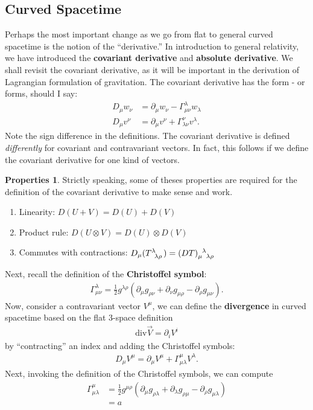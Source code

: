 \documentclass{book}
\numberwithin{equation}{section}
\theoremstyle{definition}
\newtheorem{propty}{Properties}[section]
\newcommand{\p}{\partial}
\begin{document}
\subsection{Curved Spacetime}
Perhaps the most important change as we go from flat to general curved spacetime is the notion of the ``derivative.'' In introduction to general relativity, we have introduced the \textbf{covariant derivative} and \textbf{absolute derivative}. We shall revisit the covariant derivative, as it will be important in the derivation of Lagrangian formulation of gravitation. The covariant derivative has the form - or forms, should I say:
\begin{align}
D_\mu w_\nu &= \p_\mu w_\nu - \Gamma^\lambda_{\mu\nu}w_\lambda\\
D_\mu v^\nu &= \p_\mu v^\nu + \Gamma^\nu_{\lambda\nu}v^\lambda.
\end{align}
Note the sign difference in the definitions. The covariant derivative is defined \textit{differently} for covariant and contravariant vectors. In fact, this follows if we define the covariant derivative for one kind of vectors.
\begin{propty}
	Strictly speaking, some of theses properties are required for the definition of the covariant derivative to make sense and work. 
	\begin{enumerate}
		\item Linearity: $D(U+V) = D(U) + D(V)$
		\item Product rule: $D(U\otimes V) = D(U)\otimes D(V)$
		\item Commutes with contractions: $D_\mu(\tensor{T}{^{\lambda}_{\lambda\rho}}) = \tensor{(DT)}{_\mu^\lambda_{\lambda\rho}}$
	\end{enumerate}
\end{propty} 
Next, recall the definition of the \textbf{Christoffel symbol}:
\begin{align}
\Gamma^{\lambda}_{\mu\nu} = \frac{1}{2}g^{\lambda\rho}\left(
   \p_{\mu}g_{\rho\nu}
 + \p_{\nu}g_{\mu\rho}
 - \p_{\rho}g_{\mu\nu}
 \right).
\end{align}
Now, consider a contravariant vector $V^\mu$, we can define the \textbf{divergence} in curved spacetime based on the flat 3-space definition
\begin{align}
\text{div}\vec{V} = \p_i V^i
\end{align}
by ``contracting'' an index and adding the Christoffel symbols:
\begin{align}
D_\mu V^\mu = \p_\mu V^\mu + \Gamma^\mu_{\mu\lambda}V^\lambda.
\end{align}
Next, invoking the definition of the Christoffel symbols, we can compute 
\begin{align}
\Gamma^\mu_{\mu\lambda} &= \frac{1}{2}g^{\mu\rho}(\p_\mu g_{\rho\lambda} + \p_\lambda g_{\rho\mu} - \p_\rho g_{\mu\lambda})\\
&= a
\end{align}
\end{document}

